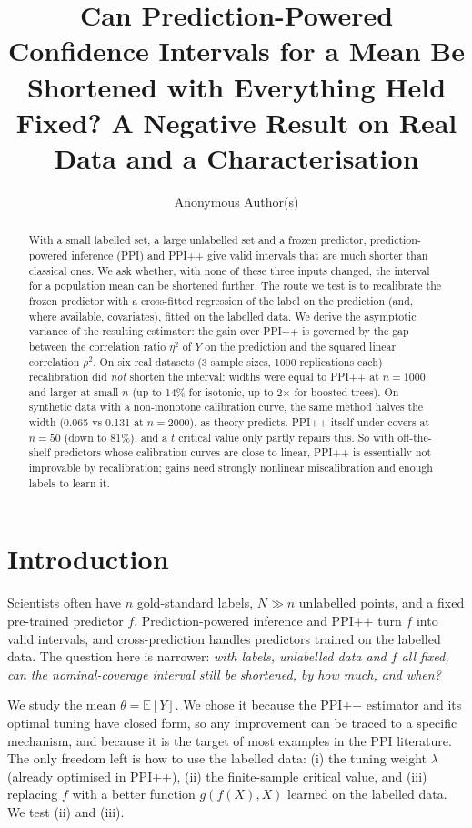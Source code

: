 \documentclass{article}
\title{Can Prediction-Powered Confidence Intervals for a Mean Be Shortened with Everything Held Fixed? A Negative Result on Real Data and a Characterisation}
\author{Anonymous Author(s)}
\newcommand{\E}{\mathbb{E}}\newcommand{\Var}{\operatorname{Var}}\newcommand{\Cov}{\operatorname{Cov}}
\begin{document}
\maketitle
\begin{abstract}
With a small labelled set, a large unlabelled set and a frozen predictor, prediction-powered inference (PPI) and PPI++ give valid intervals that are much shorter than classical ones. We ask whether, with none of these three inputs changed, the interval for a population mean can be shortened further. The route we test is to recalibrate the frozen predictor with a cross-fitted regression of the label on the prediction (and, where available, covariates), fitted on the labelled data. We derive the asymptotic variance of the resulting estimator: the gain over PPI++ is governed by the gap between the correlation ratio $\eta^2$ of $Y$ on the prediction and the squared linear correlation $\rho^2$. On six real datasets (3 sample sizes, 1000 replications each) recalibration did \emph{not} shorten the interval: widths were equal to PPI++ at $n=1000$ and larger at small $n$ (up to 14\% for isotonic, up to 2$\times$ for boosted trees). On synthetic data with a non-monotone calibration curve, the same method halves the width (0.065 vs 0.131 at $n=2000$), as theory predicts. PPI++ itself under-covers at $n=50$ (down to 81\%), and a $t$ critical value only partly repairs this. So with off-the-shelf predictors whose calibration curves are close to linear, PPI++ is essentially not improvable by recalibration; gains need strongly nonlinear miscalibration and enough labels to learn it.
\end{abstract}

\section{Introduction}
Scientists often have $n$ gold-standard labels, $N\gg n$ unlabelled points, and a fixed pre-trained predictor $f$. Prediction-powered inference \citep{ppi} and PPI++ \citep{ppipp} turn $f$ into valid intervals, and cross-prediction \citep{crossppi} handles predictors trained on the labelled data. The question here is narrower: \emph{with labels, unlabelled data and $f$ all fixed, can the nominal-coverage interval still be shortened, by how much, and when?}

We study the mean $\theta=\E[Y]$. We chose it because the PPI++ estimator and its optimal tuning have closed form, so any improvement can be traced to a specific mechanism, and because it is the target of most examples in the PPI literature. The only freedom left is how to use the labelled data: (i) the tuning weight $\lambda$ (already optimised in PPI++), (ii) the finite-sample critical value, and (iii) replacing $f$ with a better function $g(f(X),X)$ learned on the labelled data. We test (ii) and (iii). 
\end{document}

